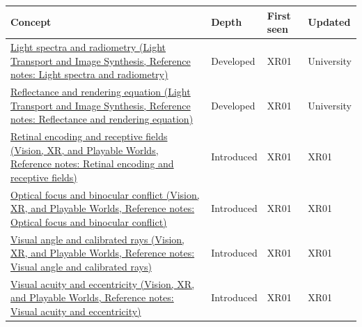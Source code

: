 {\def\LTcaptype{none} %
\begin{longtable}[]{@{}
  >{\raggedright\arraybackslash}p{}
  >{\raggedright\arraybackslash}p{}
  >{\raggedright\arraybackslash}p{}
  >{\raggedright\arraybackslash}p{}@{}}
\toprule\noalign{}
\begin{minipage}[b]{\linewidth}\raggedright
Concept
\end{minipage} & \begin{minipage}[b]{\linewidth}\raggedright
Depth
\end{minipage} & \begin{minipage}[b]{\linewidth}\raggedright
First seen
\end{minipage} & \begin{minipage}[b]{\linewidth}\raggedright
Updated
\end{minipage} \\
\midrule\noalign{}
\endhead
\bottomrule\noalign{}
\endlastfoot
\href{../04-Light-Transport-and-Image-Synthesis/main.pdf\#nameddest=appendix-215c2570199b}{Light spectra and radiometry (Light Transport and Image Synthesis, Reference notes: Light spectra and radiometry)} & Developed & XR01 & University \\
\href{../04-Light-Transport-and-Image-Synthesis/main.pdf\#nameddest=appendix-96da0b153b77}{Reflectance and rendering equation (Light Transport and Image Synthesis, Reference notes: Reflectance and rendering equation)} & Developed & XR01 & University \\
\href{../07-Vision-XR-and-Playable-Worlds/main.pdf\#nameddest=appendix-7281c15ac44a}{Retinal encoding and receptive fields (Vision, XR, and Playable Worlds, Reference notes: Retinal encoding and receptive fields)} & Introduced & XR01 & XR01 \\
\href{../07-Vision-XR-and-Playable-Worlds/main.pdf\#nameddest=appendix-f90cee1be7a4}{Optical focus and binocular conflict (Vision, XR, and Playable Worlds, Reference notes: Optical focus and binocular conflict)} & Introduced & XR01 & XR01 \\
\href{../07-Vision-XR-and-Playable-Worlds/main.pdf\#nameddest=appendix-7d356c396d1a}{Visual angle and calibrated rays (Vision, XR, and Playable Worlds, Reference notes: Visual angle and calibrated rays)} & Introduced & XR01 & XR01 \\
\href{../07-Vision-XR-and-Playable-Worlds/main.pdf\#nameddest=appendix-b491fc48c54b}{Visual acuity and eccentricity (Vision, XR, and Playable Worlds, Reference notes: Visual acuity and eccentricity)} & Introduced & XR01 & XR01 \\

\end{longtable}}
